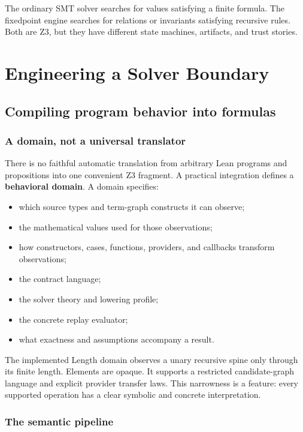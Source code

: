 \documentclass[10pt,letterpaper,oneside]{report}
\newcommand{\term}[1]{\textbf{#1}}
\begin{document}
\begin{checkpoint}
The ordinary SMT solver searches for values satisfying a finite formula. The fixedpoint engine searches for relations or invariants satisfying recursive rules. Both are Z3, but they have different state machines, artifacts, and trust stories.
\end{checkpoint}


\part{Engineering a Solver Boundary}

\chapter{Compiling program behavior into formulas}
\label{chap:compile-behavior}

\section{A domain, not a universal translator}

There is no faithful automatic translation from arbitrary Lean programs and propositions into one convenient Z3 fragment. A practical integration defines a \term{behavioral domain}. A domain specifies:

\begin{itemize}
\item which source types and term-graph constructs it can observe;
\item the mathematical values used for those observations;
\item how constructors, cases, functions, providers, and callbacks transform observations;
\item the contract language;
\item the solver theory and lowering profile;
\item the concrete replay evaluator;
\item what exactness and assumptions accompany a result.
\end{itemize}

The implemented Length domain observes a unary recursive spine only through its finite length. Elements are opaque. It supports a restricted candidate-graph language and explicit provider transfer laws. This narrowness is a feature: every supported operation has a clear symbolic and concrete interpretation.

\section{The semantic pipeline}
\end{document}
